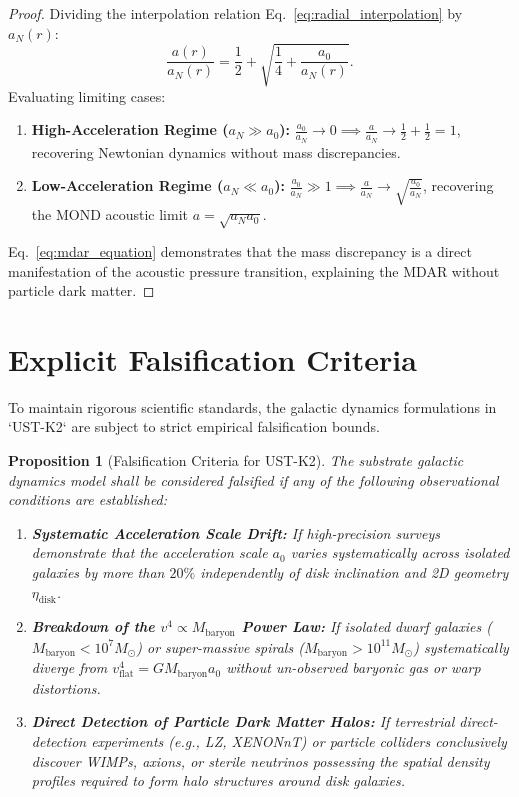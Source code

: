 \documentclass[11pt,a4paper]{article}
\newtheorem{prop}{Proposition}
\begin{document}
	\begin{proof}
		Dividing the interpolation relation Eq.\ \eqref{eq:radial_interpolation} by $a_N(r)$:
		\begin{equation}
			\frac{a(r)}{a_N(r)} = \frac{1}{2} + \sqrt{\frac{1}{4} + \frac{a_0}{a_N(r)}}.
		\end{equation}
		Evaluating limiting cases:
		\begin{enumerate}
			\item \textbf{High-Acceleration Regime ($a_N \gg a_0$):} $\frac{a_0}{a_N} \to 0 \implies \frac{a}{a_N} \to \frac{1}{2} + \frac{1}{2} = 1$, recovering Newtonian dynamics without mass discrepancies.
			\item \textbf{Low-Acceleration Regime ($a_N \ll a_0$):} $\frac{a_0}{a_N} \gg 1 \implies \frac{a}{a_N} \to \sqrt{\frac{a_0}{a_N}}$, recovering the MOND acoustic limit $a = \sqrt{a_N a_0}$.
		\end{enumerate}
		Eq.\ \eqref{eq:mdar_equation} demonstrates that the mass discrepancy is a direct manifestation of the acoustic pressure transition, explaining the MDAR without particle dark matter.
	\end{proof}
	
	\section{Explicit Falsification Criteria}
	\label{sec:falsification_tests}
	
	To maintain rigorous scientific standards, the galactic dynamics formulations in `UST-K2` are subject to strict empirical falsification bounds.
	
	\begin{prop}[Falsification Criteria for UST-K2]
		\label{prop:falsification_bounds_k2}
		The substrate galactic dynamics model shall be considered falsified if any of the following observational conditions are established:
		\begin{enumerate}
			\item \textbf{Systematic Acceleration Scale Drift:} If high-precision surveys demonstrate that the acceleration scale $a_0$ varies systematically across isolated galaxies by more than $20\%$ independently of disk inclination and 2D geometry $\eta_{\text{disk}}$.
			\item \textbf{Breakdown of the $v^4 \propto M_{\text{baryon}}$ Power Law:} If isolated dwarf galaxies ($M_{\text{baryon}} < 10^7 M_\odot$) or super-massive spirals ($M_{\text{baryon}} > 10^{11} M_\odot$) systematically diverge from $v_{\text{flat}}^4 = G M_{\text{baryon}} a_0$ without un-observed baryonic gas or warp distortions.
			\item \textbf{Direct Detection of Particle Dark Matter Halos:} If terrestrial direct-detection experiments (e.g., LZ, XENONnT) or particle colliders conclusively discover WIMPs, axions, or sterile neutrinos possessing the spatial density profiles required to form halo structures around disk galaxies.
		\end{enumerate}
	\end{prop}
	
\end{document}
